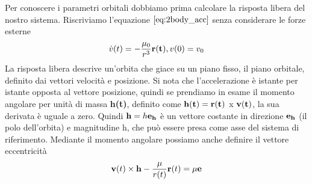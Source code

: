 Per conoscere i parametri orbitali dobbiamo prima calcolare la risposta libera
del nostro sistema. Riscriviamo l'equazione $\ref{eq:2body_acc}$ senza
considerare le forze esterne
\begin{equation}
\dot{v}(t)=-\frac{\mu_0}{r^3}{\bf r(t)}, v(0)=v_0
\end{equation}
La risposta libera descrive un'orbita che giace su un piano fisso, il piano
orbitale, definito dai vettori velocità e posizione. Si nota che l'accelerazione
è istante per istante opposta al vettore posizione, quindi se prendiamo in esame
il momento angolare per unità di massa {\bf h(t)}, definito come ${\bf
h(t)}={\bf r(t)}$ x ${\bf v(t)}$, la sua derivata è uguale a zero. Quindi ${\bf
h}=h{\bf e_h}$ è un vettore costante in direzione ${\bf e_h}$ (il polo dell'orbita) e
magnitudine h, che può essere presa come asse del sistema di riferimento.
Mediante il momento angolare possiamo anche definire il vettore eccentricità
\[ {\bf v}(t) \times {\bf h} - \frac{\mu}{r(t)}{\bf r}(t)=\mu{\bf e} \]
